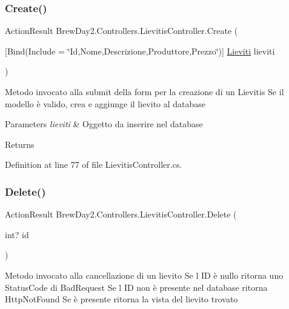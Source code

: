 \subsubsection{\texorpdfstring{Create()}{Create()}\hspace{0.1cm}{\footnotesize\ttfamily [2/2]}}
{\footnotesize\ttfamily Action\+Result Brew\+Day2.\+Controllers.\+Lievitis\+Controller.\+Create (\begin{DoxyParamCaption}\item[{\mbox{[}\+Bind(\+Include = \char`\"{}\+Id,\+Nome,\+Descrizione,\+Produttore,\+Prezzo\char`\"{})\mbox{]} \mbox{\hyperlink{class_brew_day2_1_1_models_1_1_lieviti}{Lieviti}}}]{lieviti }\end{DoxyParamCaption})}



Metodo invocato alla submit della form per la creazione di un Lievitis Se il modello è valido, crea e aggiunge il lievito al database 


\begin{DoxyParams}{Parameters}
{\em lieviti} & Oggetto da inserire nel database\\
\hline
\end{DoxyParams}
\begin{DoxyReturn}{Returns}

\end{DoxyReturn}


Definition at line 77 of file Lievitis\+Controller.\+cs.

\mbox{\label{class_brew_day2_1_1_controllers_1_1_lievitis_controller_aeba252744eb8b94117f757f786418295}} 
\subsubsection{\texorpdfstring{Delete()}{Delete()}}
{\footnotesize\ttfamily Action\+Result Brew\+Day2.\+Controllers.\+Lievitis\+Controller.\+Delete (\begin{DoxyParamCaption}\item[{int?}]{id }\end{DoxyParamCaption})}



Metodo invocato alla cancellazione di un lievito Se l\textquotesingle{} ID è nullo ritorna uno Status\+Code di Bad\+Request Se l\textquotesingle{} ID non è presente nel database ritorna Http\+Not\+Found Se è presente ritorna la vista del lievito trovato 


